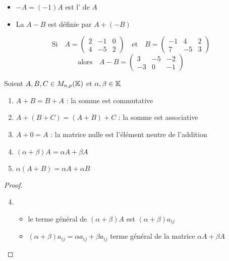 
\begin{frame}

  \begin{itemize}
  \item $-A=(-1)A$ est l' de $A$
\item\pause La  $A-B$ est définie par $A + (-B)$
\end{itemize}

\pause
\begin{exemple}
\[
\text{Si} \quad A =  \begin{pmatrix} 
2 & -1 & 0\\
4 & -5 & 2
\end{pmatrix}
\quad \text{et} \quad 
B  =  \begin{pmatrix} 
-1 & 4 & 2\\
7 & -5 & 3
\end{pmatrix}
\]
\[ \text{alors} \quad
A-B  = \begin{pmatrix}  
3 & -5 & -2\\
-3 & 0 & -1
\end{pmatrix}
\]
\end{exemple}

\end{frame}


\begin{frame}

Soient $A,B, C\in M_{n,p}(\mathbb{K})$ et $\alpha, \beta \in \mathbb{K}$
\pause
\begin{proposition}
\begin{enumerate}
  \item $A + B = B + A$ : la somme est commutative
  \item\pause $A + (B+C) = (A + B) + C$ : la somme est associative
  \item\pause $A + 0 = A$ : la matrice nulle est l'élément neutre de l'addition
  \item\pause $(\alpha + \beta )A =\alpha A + \beta A$
  \item\pause $\alpha (A+B)=\alpha A + \alpha B$
\end{enumerate}
\end{proposition}

\pause
\begin{proof}
 
\begin{enumerate}
\setcounter{enumi}{3}
  \item
  \begin{itemize}
  \item le terme général de $(\alpha + \beta ) A $ est $(\alpha + \beta)a_{ij}$
  \item\pause $(\alpha + \beta)a_{ij}=\alpha a_{ij}+ \beta a_{ij}$ \pause terme général de la matrice $\alpha A + \beta A$
\end{itemize}  
\end{enumerate}
\end{proof}

\end{frame}

